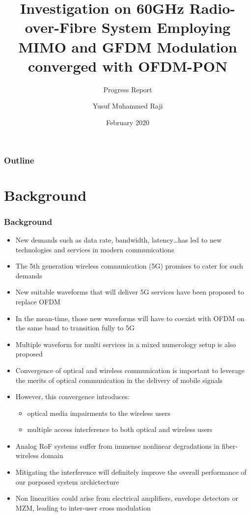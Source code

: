 \documentclass[t]{beamer}
\title[60GHz RoF]{Investigation on 60GHz Radio-over-Fibre System Employing MIMO and GFDM Modulation converged with OFDM-PON}
\subtitle{Progress Report}
\author{Yusuf Muhammed Raji}
\institute[MMU]{Multimedia University}
\date[Feb 2020]{February 2020}
\begin{document}
\begin{frame}
    \begin{titlepage}
        
    \end{titlepage}    
\end{frame}

\begin{frame}
    \frametitle{Outline}
    \tableofcontents
    
\end{frame}

\section{Background}

\begin{frame}[allowframebreaks]
    \frametitle{Background}
    \begin{itemize}
        \item New demands such as data rate, bandwidth, latency\dots has led to new technologies and services in modern communications 
        \item The 5th generation wireless communication (5G) promises to cater for such demands \cite{Sarmiento2018,Eldessoki2017}
        \item New suitable waveforms that will deliver 5G services have been proposed to replace OFDM \cite{Delmade2017,Tipan2018,Browning2017}
        \item In the mean-time, those new waveforms will have to coexist with OFDM on the same band to transition fully to 5G
        \item Multiple waveform for multi services in a mixed numerology setup is also proposed \cite{Eldessoki2017}
        \item Convergence of optical and wireless communication is important to leverage the merits of optical communication in the delivery of mobile signals \cite{Tipan2018,Chang2017,Dat2018,Browning2017}
        \item However, this convergence introduces:
        \begin{itemize}
            \item optical media impairments to the wireless users
            \item multiple access interference to both optical and wireless users
        \end{itemize}   
        \item Analog RoF systems suffer from immense nonlinear degradations in fiber-wireless domain
        \item Mitigating the interference will definitely improve the overall performance of our porposed system archictecture
        \item Non linearities could arise from electrical amplifiers, envelope detectors or MZM, leading to inter-user cross modulation       
    \end{itemize}
    
    
\end{frame}
\end{document}
